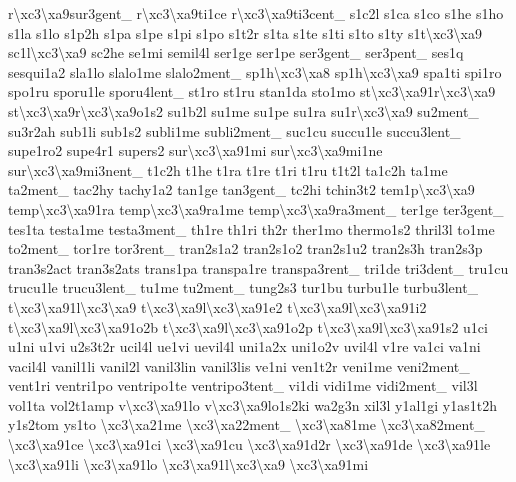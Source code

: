{r\textbackslash{}xc3\textbackslash{}xa9sur3gent\-\_\- r\textbackslash{}xc3\textbackslash{}xa9ti1ce r\textbackslash{}xc3\textbackslash{}xa9ti3cent\-\_\- s1c2l s1ca s1co s1he s1ho s1la s1lo s1p2h s1pa s1pe s1pi s1po s1t2r s1ta s1te s1ti s1to s1ty s1t\textbackslash{}xc3\textbackslash{}xa9 sc1l\textbackslash{}xc3\textbackslash{}xa9 sc2he se1mi semil4l ser1ge ser1pe ser3gent\-\_\- ser3pent\-\_\- ses1q sesqui1a2 sla1lo slalo1me slalo2ment\-\_\- sp1h\textbackslash{}xc3\textbackslash{}xa8 sp1h\textbackslash{}xc3\textbackslash{}xa9 spa1ti spi1ro spo1ru sporu1le sporu4lent\-\_\- st1ro st1ru stan1da sto1mo st\textbackslash{}xc3\textbackslash{}xa91r\textbackslash{}xc3\textbackslash{}xa9 st\textbackslash{}xc3\textbackslash{}xa9r\textbackslash{}xc3\textbackslash{}xa9o1s2 su1b2l su1me su1pe su1ra su1r\textbackslash{}xc3\textbackslash{}xa9 su2ment\-\_\- su3r2ah sub1li sub1s2 subli1me subli2ment\-\_\- suc1cu succu1le succu3lent\-\_\- supe1ro2 supe4r1 supers2 sur\textbackslash{}xc3\textbackslash{}xa91mi sur\textbackslash{}xc3\textbackslash{}xa9mi1ne sur\textbackslash{}xc3\textbackslash{}xa9mi3nent\-\_\- t1c2h t1he t1ra t1re t1ri t1ru t1t2l ta1c2h ta1me ta2ment\-\_\- tac2hy tachy1a2 tan1ge tan3gent\-\_\- tc2hi tchin3t2 tem1p\textbackslash{}xc3\textbackslash{}xa9 temp\textbackslash{}xc3\textbackslash{}xa91ra temp\textbackslash{}xc3\textbackslash{}xa9ra1me temp\textbackslash{}xc3\textbackslash{}xa9ra3ment\-\_\- ter1ge ter3gent\-\_\- tes1ta testa1me testa3ment\-\_\- th1re th1ri th2r ther1mo thermo1s2 thril3l to1me to2ment\-\_\- tor1re tor3rent\-\_\- tran2s1a2 tran2s1o2 tran2s1u2 tran2s3h tran2s3p tran3s2act tran3s2ats trans1pa transpa1re transpa3rent\-\_\- tri1de tri3dent\-\_\- tru1cu trucu1le trucu3lent\-\_\- tu1me tu2ment\-\_\- tung2s3 tur1bu turbu1le turbu3lent\-\_\- t\textbackslash{}xc3\textbackslash{}xa91l\textbackslash{}xc3\textbackslash{}xa9 t\textbackslash{}xc3\textbackslash{}xa9l\textbackslash{}xc3\textbackslash{}xa91e2 t\textbackslash{}xc3\textbackslash{}xa9l\textbackslash{}xc3\textbackslash{}xa91i2 t\textbackslash{}xc3\textbackslash{}xa9l\textbackslash{}xc3\textbackslash{}xa91o2b t\textbackslash{}xc3\textbackslash{}xa9l\textbackslash{}xc3\textbackslash{}xa91o2p t\textbackslash{}xc3\textbackslash{}xa9l\textbackslash{}xc3\textbackslash{}xa91s2 u1ci u1ni u1vi u2s3t2r ucil4l ue1vi uevil4l uni1a2x uni1o2v uvil4l v1re va1ci va1ni vacil4l vanil1li vanil2l vanil3lin vanil3lis ve1ni ven1t2r veni1me veni2ment\-\_\- vent1ri ventri1po ventripo1te ventripo3tent\-\_\- vi1di vidi1me vidi2ment\-\_\- vil3l vol1ta vol2t1amp v\textbackslash{}xc3\textbackslash{}xa91lo v\textbackslash{}xc3\textbackslash{}xa9lo1s2ki wa2g3n xil3l y1al1gi y1as1t2h y1s2tom ys1to \textbackslash{}xc3\textbackslash{}xa21me \textbackslash{}xc3\textbackslash{}xa22ment\-\_\- \textbackslash{}xc3\textbackslash{}xa81me \textbackslash{}xc3\textbackslash{}xa82ment\-\_\- \textbackslash{}xc3\textbackslash{}xa91ce \textbackslash{}xc3\textbackslash{}xa91ci \textbackslash{}xc3\textbackslash{}xa91cu \textbackslash{}xc3\textbackslash{}xa91d2r \textbackslash{}xc3\textbackslash{}xa91de \textbackslash{}xc3\textbackslash{}xa91le \textbackslash{}xc3\textbackslash{}xa91li \textbackslash{}xc3\textbackslash{}xa91lo \textbackslash{}xc3\textbackslash{}xa91l\textbackslash{}xc3\textbackslash{}xa9 \textbackslash{}xc3\textbackslash{}xa91mi }
